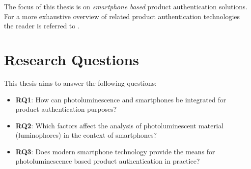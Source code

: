 \documentclass[thesis.tex]{subfiles}
\begin{document}
The focus of this thesis is on \emph{smartphone based} product authentication solutions. For a more exhaustive overview of related product authentication technologies the reader is referred to \cite{kuosmanen}.

\section{Research Questions}
\label{chapter:research-questions}

This thesis aims to answer the following questions:

\begin{itemize}
  \item \label{RQ1} \textbf{RQ1}: How can photoluminescence and smartphones be integrated for product authentication purposes?
  \item \label{RQ2} \textbf{RQ2}: Which factors affect the analysis of photoluminescent material (luminophores) in the context of smartphones?
  \item \label{RQ3} \textbf{RQ3}: Does modern smartphone technology provide the means for photoluminescence based product authentication in practice?
\end{itemize}
\end{document}
